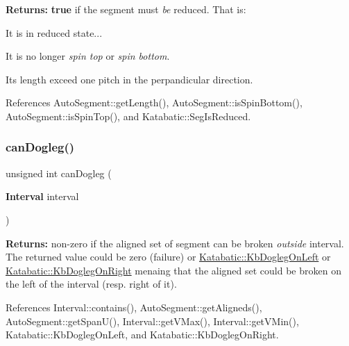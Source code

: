 {\bfseries Returns\+:} {\bfseries true} if the segment must {\itshape be} reduced. That is\+:
\begin{DoxyItemize}
\item It is in reduced state...
\item It is no longer {\itshape spin top} or {\itshape spin bottom}.
\item It\textquotesingle{}s length exceed one pitch in the perpandicular direction. 
\end{DoxyItemize}

References Auto\+Segment\+::get\+Length(), Auto\+Segment\+::is\+Spin\+Bottom(), Auto\+Segment\+::is\+Spin\+Top(), and Katabatic\+::\+Seg\+Is\+Reduced.

\mbox{\label{classKatabatic_1_1AutoSegment_a43c865bcfcfd6132352a9ac8a84c25cd}} 
\subsubsection{\texorpdfstring{can\+Dogleg()}{canDogleg()}}
{\footnotesize\ttfamily unsigned int can\+Dogleg (\begin{DoxyParamCaption}\item[{\textbf{ Interval}}]{interval }\end{DoxyParamCaption})}

{\bfseries Returns\+:} non-\/zero if the aligned set of segment can be broken {\itshape outside} {\ttfamily interval}. The returned value could be zero (failure) or \mbox{\hyperlink{namespaceKatabatic_a2af2ad6b6441614038caf59d04b3b217a67bb7c53bbbc73a0e2d1f3f3e16ab679}{Katabatic\+::\+Kb\+Dogleg\+On\+Left}} or \mbox{\hyperlink{namespaceKatabatic_a2af2ad6b6441614038caf59d04b3b217afe7fcb4c332f36e477433169b3d3f515}{Katabatic\+::\+Kb\+Dogleg\+On\+Right}} menaing that the aligned set could be broken on the left of the {\ttfamily interval} (resp. right of it). 

References Interval\+::contains(), Auto\+Segment\+::get\+Aligneds(), Auto\+Segment\+::get\+Span\+U(), Interval\+::get\+V\+Max(), Interval\+::get\+V\+Min(), Katabatic\+::\+Kb\+Dogleg\+On\+Left, and Katabatic\+::\+Kb\+Dogleg\+On\+Right.

\mbox{\label{classKatabatic_1_1AutoSegment_aad55626c9d793a0b08bcff5be2a5ad0c}} 
